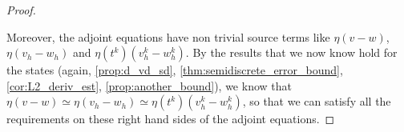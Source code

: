 \documentclass[english,a4paper,10pt,oneside]{scrbook}	%
\theoremstyle{break}
\newenvironment{mproof}[1][\proofname]{%
  \begin{proof}[#1]$ $\par\nobreak\ignorespaces
}{%
  \end{proof}
}
\renewcommand*{\proofname}{Proof}
\theoremstyle{remark}
\begin{document}
\begin{mproof}
Moreover, the adjoint equations have non trivial source terms like $\eta(v-w)$, $\eta(v_h-w_h)$ and $\eta(t^k)(v_h^k-w_h^k)$. By the results that we now know hold for the states (again, \cref{prop:d_vd_sd}, \cref{thm:semidiscrete_error_bound}, \cref{cor:L2_deriv_est}, \cref{prop:another_bound}), we know that $\eta(v-w)\simeq\eta(v_h-w_h)\simeq \eta(t^k)(v_h^k-w_h^k)$, so that we can satisfy all the requirements on these right hand sides of the adjoint equations. 
\end{mproof}

%
%
%
%
\end{document}

